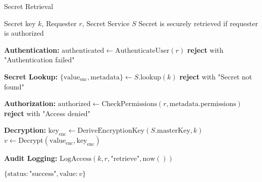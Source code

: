 \begin{tcolorbox}[
    enhanced,
    colback=blue!5!white,
    colframe=blue!75!black,
    arc=5mm,
    boxrule=1.5pt,
    title=Secret Retrieval Protocol,
    fonttitle=\bfseries,
    coltitle=white,
    attach boxed title to top left={yshift=-2mm, xshift=5mm},
    boxed title style={colback=blue!75!black, rounded corners},
    shadow={2mm}{-2mm}{0mm}{black!50},
    drop fuzzy shadow
]
\begin{protocol}{Secret Retrieval}
\label{prot:secret-retrieval}
\begin{algorithmic}[1]
\Require Secret key $k$, Requester $r$, Secret Service $S$
\Ensure Secret is securely retrieved if requester is authorized

\State \textbf{Authentication:}
\State $\text{authenticated} \gets \text{AuthenticateUser}(r)$
    \State \textbf{reject} with "Authentication failed"
\EndIf

\State \textbf{Secret Lookup:}
\State $\{\text{value}_{\text{enc}}, \text{metadata}\} \gets S.\text{lookup}(k)$
    \State \textbf{reject} with "Secret not found"
\EndIf

\State \textbf{Authorization:}
\State $\text{authorized} \gets \text{CheckPermissions}(r, \text{metadata}.\text{permissions})$
    \State \textbf{reject} with "Access denied"
\EndIf

\State \textbf{Decryption:}
\State $\text{key}_{\text{enc}} \gets \text{DeriveEncryptionKey}(S.\text{masterKey}, k)$
\State $v \gets \text{Decrypt}(\text{value}_{\text{enc}}, \text{key}_{\text{enc}})$

\State \textbf{Audit Logging:}
\State $\text{LogAccess}(k, r, \text{"retrieve"}, \text{now}())$

\State \Return $\{\text{status}: \text{"success"}, \text{value}: v\}$
\end{algorithmic}
\end{protocol}
\end{tcolorbox}

